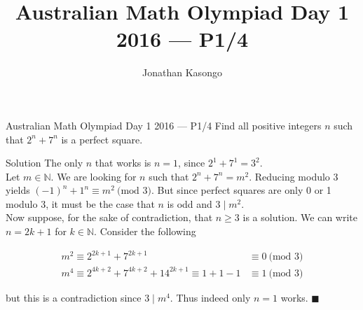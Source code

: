 \documentclass{article}
\author{Jonathan Kasongo}
\title{Australian Math Olympiad Day 1 2016 --- P1/4}
\begin{document}
\maketitle

\begin{problem}{Australian Math Olympiad Day 1 2016 --- P1/4}
Find all positive integers $n$ such that $2^n + 7^n$ is a perfect square.
\end{problem}

\begin{solution}{Solution}
The only $n$ that works is $n=1$, since $2^1 + 7^1 = 3^2$. \\

Let $m \in \mathbb{N}$. We are looking for $n$ such that $2^n + 7^n = m^2$.
Reducing modulo 3 yields $(-1)^n + 1^n \equiv m^2 \ \text{(mod } 3)$. But
since perfect squares are only 0 or 1 modulo 3, it must be the case that
$n$ is odd and $3 \mid m^2$.\\

Now suppose, for the sake of contradiction, that $n \geq 3$ is a solution.
We can write $n = 2k + 1$ for $k \in \mathbb{N}$. Consider the following

\[
\begin{aligned}
m^2 \equiv 2^{2k + 1} + 7^{2k + 1} &\equiv 0 \ \text{(mod } 3) \\
m^4 \equiv 2^{4k + 2} + 7^{4k + 2} + 14^{2k + 1} \equiv 1+1-1 &\equiv 1 \
\text{(mod } 3)
\end{aligned}
\]

but this is a contradiction since $3 \mid m^4$. Thus indeed only $n=1$
works. $\blacksquare$
\end{solution}
\end{document}
